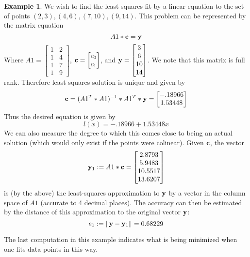 \documentclass[11pt,notitlepage]{article}
\numberwithin{equation}{section}
\theoremstyle{plain}
\theoremstyle{definition}
\newtheorem{example}[equation]{Example}
\begin{document}
\begin{example} We wish to find the least-squares fit by a linear equation to the set of points $(2,3), (4,6), (7,10), (9,14)$. This problem can be represented by the matrix equation
\[
A1*{\bf c} = {\bf y}
\]
Where $A1 = \begin{bmatrix} 1 & 2\\1 & 4\\1 & 7\\1 & 9\end{bmatrix}$, ${\bf c} = \begin{bmatrix}c_0\\c_1\end{bmatrix}$, and ${\bf y} = \begin{bmatrix} 3\\6\\10\\14\end{bmatrix}$. We note that this matrix is full rank. Therefore least-squares solution is unique and given by
\[
{\bf c} = (A1^T*A1)^{-1}*A1^T*{\bf y} = \begin{bmatrix}-.18966\\ 1.53448\end{bmatrix}
\]
Thus the desired equation is given by
\[
l(x) = -.18966 + 1.53448 x
\]
We can also measure the degree to which this comes close to being an actual solution (which would only exist if the points were colinear). Given $\bf c$, the vector
\[
{\bf y}_1 := A1*{\bf c} = \begin{bmatrix} 2.8793\\ 5.9483\\ 10.5517\\ 13.6207\end{bmatrix}
\]
is (by the above) the least-squares approximation to $\bf y$ by a vector in the column space of $A1$ (accurate to 4 decimal places). The accuracy can then be estimated by the distance of this approximation to the original vector $\bf y$:
\[
e_1 := \|{\bf y} - {\bf y}_1\| = 0.68229
\]
\end{example}

The last computation in this example indicates what is being minimized when one fits data points in this way. 
\end{document}
